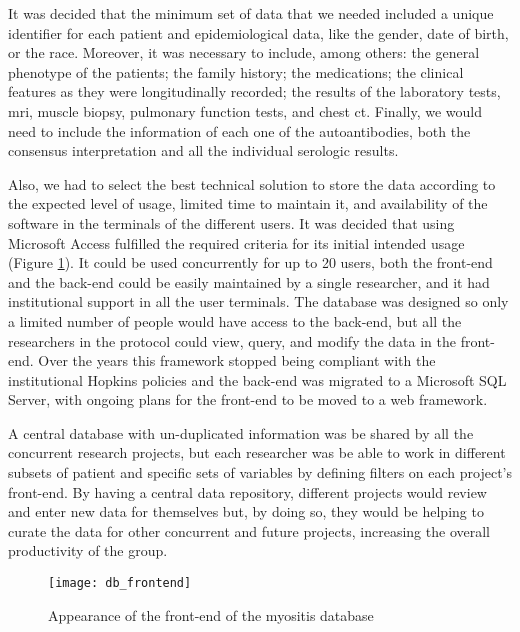It was decided that the minimum set of data that we needed included a unique identifier for each patient and epidemiological data, like the gender, date of birth, or the race. Moreover, it was necessary to include, among others: the general phenotype of the patients; the family history; the medications; the clinical features as they were longitudinally recorded; the results of the laboratory tests, \gls{mri}, muscle biopsy, pulmonary function tests, and chest \gls{ct}. Finally, we would need to include the information of each one of the autoantibodies, both the consensus interpretation and all the individual serologic results.

Also, we had to select the best technical solution to store the data according to the expected level of usage, limited time to maintain it, and availability of the software in the terminals of the different users. It was decided that using Microsoft Access fulfilled the required criteria for its initial intended usage (Figure \ref{fig:db_frontend}). It could be used concurrently for up to 20 users, both the front-end and the back-end could be easily maintained by a single researcher, and it had institutional support in all the user terminals. The database was designed so only a limited number of people would have access to the back-end, but all the researchers in the protocol could view, query, and modify the data in the front-end. Over the years this framework stopped being compliant with the institutional Hopkins policies and the back-end was migrated to a Microsoft SQL Server, with ongoing plans for the front-end to be moved to a web framework.

A central database with un-duplicated information was be shared by all the concurrent research projects, but each researcher was be able to work in different subsets of patient and specific sets of variables by defining filters on each project's front-end. By having a central data repository, different projects would review and enter new data for themselves but, by doing so, they would be helping to curate the data for other concurrent and future projects, increasing the overall productivity of the group.

\begin{figure}
	\centering
	\texttt{[image: db\_frontend]}
	\caption{Appearance of the front-end of the myositis database}
	\label{fig:db_frontend}
\end{figure}

